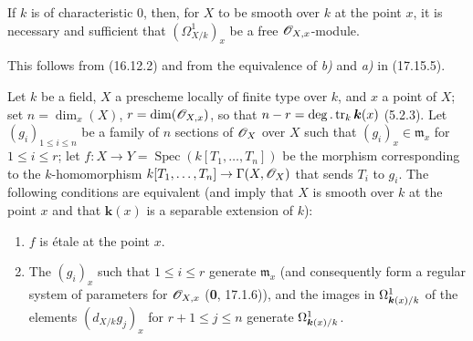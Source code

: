 \begin{corollary}[17.15.7]
\label{IV.17.15.7}
If $k$ is of characteristic \textup{0}, then, for $X$ to be smooth over $k$ at the point $x$, it is necessary and sufficient that $(\varOmega^1_{X/k})_x$ be a free $\mathscr{O}_{X,x}$-module.
\end{corollary}

This follows from (16.12.2) and from the equivalence of \emph{b)} and \emph{a)} in (17.15.5).

\begin{proposition}[17.15.8]
\label{IV.17.15.8}
Let $k$ be a field, $X$ a prescheme locally of finite type over $k$, and $x$ a point of $X$; set $n=\dim_x(X)$, $r=\dim(\mathscr{O}_{X,x})$, so that $n- r=\deg.\operatorname{tr}_k \boldsymbol{k}(x)$ \textup{(5.2.3)}. Let $(g_i)_{1\leq i\leq n}$ be a family of $n$ sections of $\mathscr{O}_X$ over $X$ such that $(g_i)_x\in\mathfrak m_x$ for $1\leq i\leq r$; let $f:X\to Y=\operatorname{Spec}(k[T_1,\ldots,T_n])$ be the morphism corresponding to the $k$-homomorphism $k[T_1,\ldots,T_n]\to\Gamma(X,\mathscr{O}_X)$ that sends $T_i$ to $g_i$. The following conditions are equivalent (and imply that $X$ is smooth over $k$ at the point $x$ and that $\boldsymbol{k}(x)$ is a separable extension of $k$):
\begin{enumerate}
  \item[\textup{a)}] $f$ is étale at the point $x$.


  \item[\textup{b)}] The $(g_i)_x$ such that $1\leq i\leq r$ generate $\mathfrak m_x$ \textup{(and consequently form a regular system of parameters for $\mathscr{O}_{X,x}$ (\textbf{0}, 17.1.6))}, and the images in $\Omega^1_{\boldsymbol{k}(x)/k}$ of the elements $(d_{X/k}g_j)_x$ for $r+1\leq j\leq n$ generate $\Omega^1_{\boldsymbol{k}(x)/k}$.
\end{enumerate}
\end{proposition}

